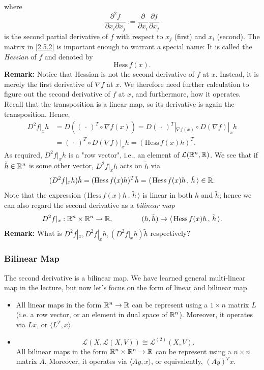 \documentclass[10pt, t, allowdisplaybreaks]{beamer}
\renewcommand{\emph}[1]{{\color{Turquoise3}\textsl{#1}}}
\newcommand{\scp}[2]{\langle\,#1\,,\,#2\,\rangle} \newcommand{\scpp}{\langle\,\cdot\,,\,\cdot\,\rangle}
\begin{document}
\begin{frame}[allowframebreaks]
    where
    \[\frac{\partial^2f}{\partial x_i\partial x_j}:=\frac{\partial}{\partial x_i}
        \frac{\partial f}{\partial x_j}\]
    is the second partial derivative of $f$ with respect to $x_j$ (first) and $x_i$ (second). The matrix in \eqref{2.5.2} is important enough to warrant a special name: It is called the \emph{Hessian} of $f$ and denoted by
    \[\text{Hess}\,f(x).\]
    \textbf{Remark:} Notice that Hessian is not the second derivative of $f$ at $x$. Instead, it is merely the first derivative of $\nabla f$ at $x$. We therefore need further calculation to figure out the second derivative of $f$ at $x$, and furthermore, how it operates.
    \newpage
    Recall that the transposition is a linear map, so its derivative is again the
    transposition. Hence,
    \begin{equation}\label{2.5.3}
        \begin{aligned}
            D^2f|_xh & =D((\,\cdot\,)^T\circ\nabla f(x))=D(\,\cdot\,)^T|_{\nabla f(x)}\circ D(\nabla f)|_xh \\
                     & =(\,\cdot\,)^T\circ D(\nabla f)|_xh=(\text{Hess}\,f(x)h)^T.
        \end{aligned}
    \end{equation}
    As required, $D^2f|_xh$ is a "row vector", i.e., an element of $\mathcal{L}(\mathbb{R}^n,\mathbb{R})$. We see that if $\tilde{h}\in\mathbb{R}^n$ is some other vector, $D^2f|_xh$ acts on $\tilde{h}$ via
    \[(D^2f|_xh)\tilde{h}=(\text{Hess}\,f(x)h)^T\tilde{h}
        =\scp{\text{Hess}\,f(x)h}{\tilde{h}}\in\R.\]
    Note that the expression $\scp{\text{Hess}\,f(x)h}{\tilde{h}}$ is linear in both $h$ and $\tilde{h}$; hence we can also regard the second derivative as a \emph{bilinear map}
    \[D^2f|_x:\R^n\times\R^n\to\R,\qquad\qquad
        (h,\tilde{h})\mapsto\scp{\text{Hess}\,f(x)h}{\tilde{h}}.\]
    \textbf{Remark:} What is $D^2f|_x, D^2f|_xh,(D^2f|_xh)\tilde{h}$ respectively?
\end{frame}

\begin{frame}
    \frametitle{Bilinear Map}
    The second derivative is a bilinear map. We have learned general multi-linear map in the lecture, but now let's focus on the form of linear and bilinear map.
    \begin{itemize}
        \item
              All linear maps in the form $\mathbb{R}^n\to\mathbb{R}$ can be represent using a $1\times n$ matrix $L$ (i.e. a row vector, or an element in dual space of $\mathbb{R}^n$). Moreover, it operates via $Lx$, or $\langle L^T,x \rangle$.
        \item
              \[\mathcal{L}(X,\mathcal{L}(X,V))\cong
                  \mathcal{L}^{(2)}(X,V).\]All bilinear maps in the form $\mathbb{R}^n\times\mathbb{R}^n\to \mathbb{R}$ can be represent using a $n\times n$ matrix $A$. Moreover, it operates via $\langle Ay,x \rangle$, or equivalently, $(Ay)^Tx$.
    \end{itemize}
\end{frame}
\end{document}
